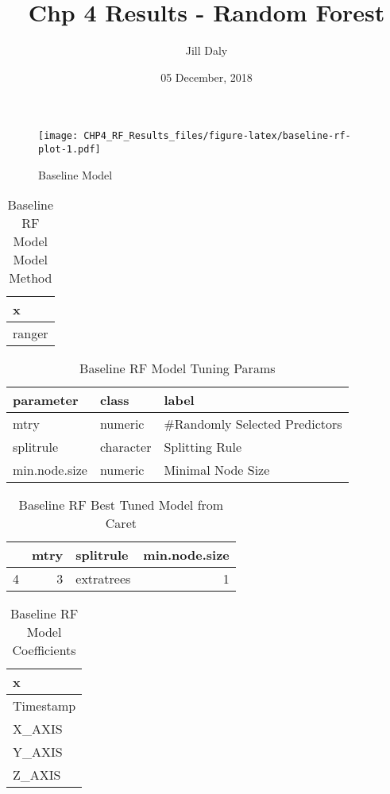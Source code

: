 \documentclass[]{article}
\title{Chp 4 Results - Random Forest}
\author{Jill Daly}
\date{05 December, 2018}
\begin{document}
\maketitle

\begin{figure}
\centering
\texttt{[image: CHP4\_RF\_Results\_files/figure-latex/baseline-rf-plot-1.pdf]}
\caption{Baseline Model}
\end{figure}

\begin{table}[!h]

\caption{\label{tab:baseline-rf-params}Baseline RF Model Model Method}
\centering
\begin{tabular}[t]{l}
\toprule
x\\
\midrule
ranger\\
\bottomrule
\end{tabular}
\end{table}

\begin{table}[!h]

\caption{\label{tab:baseline-rf-params}Baseline RF Model Tuning Params}
\centering
\begin{tabular}[t]{lll}
\toprule
parameter & class & label\\
\midrule
mtry & numeric & \#Randomly Selected Predictors\\
splitrule & character & Splitting Rule\\
min.node.size & numeric & Minimal Node Size\\
\bottomrule
\end{tabular}
\end{table}

\begin{table}[!h]

\caption{\label{tab:baseline-rf-params}Baseline RF Best Tuned Model from Caret}
\centering
\begin{tabular}[t]{lrlr}
\toprule
  & mtry & splitrule & min.node.size\\
\midrule
4 & 3 & extratrees & 1\\
\bottomrule
\end{tabular}
\end{table}

\begin{table}[!h]

\caption{\label{tab:baseline-rf-params}Baseline RF Model Coefficients}
\centering
\begin{tabular}[t]{l}
\toprule
x\\
\midrule
Timestamp\\
X\_AXIS\\
Y\_AXIS\\
Z\_AXIS\\
\bottomrule
\end{tabular}
\end{table}
\end{document}
